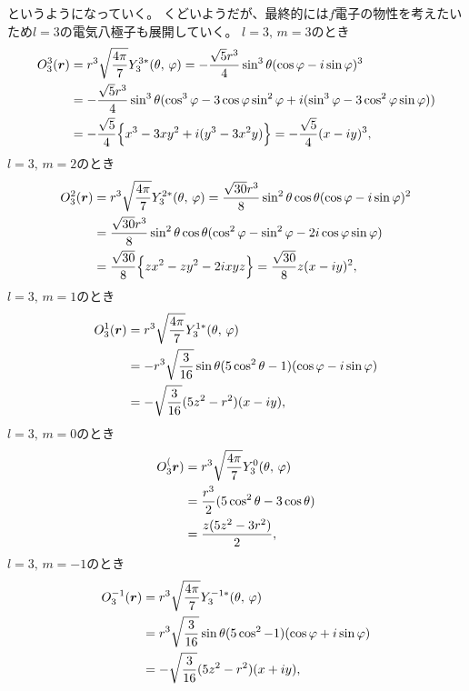 \documentclass[../../master.tex]{subfiles}
\begin{document}
というようになっていく。
くどいようだが、最終的には\(f\)電子の物性を考えたいため\(l=3\)の電気八極子も展開していく。
\(l=3,\,m=3\)のとき
\begin{equation}\begin{aligned}[b]
    O_3^3(\vb*{r})
    &= r^3 \sqrt{\frac{4\pi}{7}} Y_3^{3*}(\theta,\,\varphi)
    = -\frac{\sqrt{5}r^3}{4} \sin^3\theta (\cos\varphi-i\sin\varphi)^3\\
    &= -\frac{\sqrt{5}r^3}{4} \sin^3\theta (\cos^3\varphi - 3\cos\varphi\sin^2\varphi + i(\sin^3\varphi - 3\cos^2\varphi\sin\varphi))\\
    &= -\frac{\sqrt{5}}{4} \Big\{x^3-3xy^2+i(y^3- 3x^2y)\Big\}
    = -\frac{\sqrt{5}}{4} (x-iy)^3,
\end{aligned}\end{equation}
\(l=3,\,m=2\)のとき
\begin{equation}\begin{aligned}[b]
    O_3^2(\vb*{r})
    &= r^3 \sqrt{\frac{4\pi}{7}} Y_3^{2*}(\theta,\,\varphi)
    = \frac{\sqrt{30}r^3}{8} \sin^2\theta \cos\theta (\cos\varphi-i\sin\varphi)^2\\
    &= \frac{\sqrt{30}r^3}{8} \sin^2\theta \cos\theta (\cos^2\varphi - \sin^2\varphi - 2i\cos\varphi\sin\varphi)\\
    &= \frac{\sqrt{30}}{8} \Big\{zx^2-zy^2 -2ixyz\Big\}
    = \frac{\sqrt{30}}{8} z(x-iy)^2,
\end{aligned}\end{equation}
\(l=3,\,m=1\)のとき
\begin{equation}\begin{aligned}[b]
    O_3^1(\vb*{r})
    &= r^3 \sqrt{\frac{4\pi}{7}} Y_3^{1*}(\theta,\,\varphi)\\
    &= -r^3 \sqrt{\frac{3}{16}} \sin\theta(5\cos^2\theta-1)(\cos\varphi-i\sin\varphi)\\
    &=-\sqrt{\frac{3}{16}}(5z^2-r^2)(x-iy),
\end{aligned}\end{equation}
\(l=3,\,m=0\)のとき
\begin{equation}\begin{aligned}[b]
    O_3^(\vb*{r})
    &= r^3 \sqrt{\frac{4\pi}{7}} Y_3^{0}(\theta,\,\varphi)\\
    &= \frac{r^3}{2}  (5\cos^2\theta-3\cos\theta)\\
    &= \frac{z(5z^2-3r^2)}{2},
\end{aligned}\end{equation}
\(l=3,\,m=-1\)のとき
\begin{equation}\begin{aligned}[b]
    O_3^{-1}(\vb*{r})
    &= r^3 \sqrt{\frac{4\pi}{7}} Y_3^{-1*}(\theta,\,\varphi)\\
    &= r^3 \sqrt{\frac{3}{16}} \sin\theta(5\cos^2-1)(\cos\varphi+i\sin\varphi)\\
    &=-\sqrt{\frac{3}{16}}(5z^2-r^2)(x+iy),
\end{aligned}\end{equation}
\end{document}
